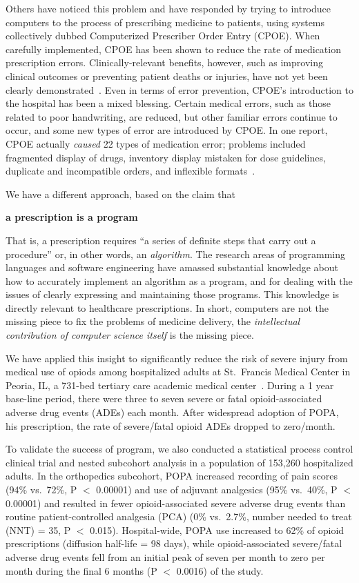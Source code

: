 \documentclass[11pt]{article}
\begin{document}
Others have noticed this problem and have responded by trying to
introduce computers to the process of prescribing medicine to
patients, using systems collectively dubbed Computerized Prescriber
Order Entry (CPOE).
%
When carefully implemented, CPOE has been shown to reduce the rate of
medication prescription errors.
%
Clinically-relevant benefits, however, such
as improving clinical outcomes or preventing patient deaths or
injuries, have not yet been clearly demonstrated~\citep{vanRosse2009}.
%
Even in terms of error prevention, CPOE's introduction to the hospital
has been a mixed blessing.
%
Certain medical errors, such as those related to poor handwriting, are
reduced, but other familiar errors continue to occur, and some new types
of error are introduced by CPOE.
%
In one report, CPOE actually \emph{caused} 22 types of medication
error; problems included fragmented display of drugs, inventory
display mistaken for dose guidelines, duplicate and incompatible
orders, and inflexible formats~\citep{Koppel2005}.

We have a different approach, based on the claim that
\begin{center}
\textbf{a prescription is a program}
\end{center}
That is, a prescription requires ``a series of definite steps that
carry out a procedure'' or, in other words, an \emph{algorithm}.
%
The research areas of programming languages and software engineering
have amassed substantial knowledge about how to accurately implement
an algorithm as a program, and for dealing with the issues of clearly
expressing and maintaining those programs.
%
This knowledge is directly
relevant to healthcare prescriptions.
%
In short, computers are not the missing piece to fix the problems of
medicine delivery, the \emph{intellectual contribution of computer
  science itself} is the missing piece.

We have applied this insight to significantly reduce the risk of severe
injury from medical use of opiods among hospitalized adults at
St.\ Francis Medical Center in Peoria, IL, a 731-bed tertiary care
academic medical center~\citep{Belknap2008}. During a 1 year base-line
period, there were three to seven severe or fatal opioid-associated
adverse drug events (ADEs) each month. After widespread adoption of
POPA, his prescription, the rate of severe/fatal opioid ADEs dropped
to zero/month. 

To validate the success of \poppl{} program, we also
conducted a statistical process control clinical trial and nested
subcohort analysis in a population of 153,260 hospitalized adults. In
the orthopedics subcohort, POPA increased recording of pain scores
(94\% vs.\ 72\%, P $<$ 0.00001) and use of adjuvant analgesics (95\%
vs.\ 40\%, P $<$ 0.00001) and resulted in fewer opioid-associated
severe adverse drug events than routine patient-controlled analgesia
(PCA) (0\% vs.\ 2.7\%, number needed to treat (NNT) = 35, P $<$
0.015). Hospital-wide, POPA use increased to 62\% of opioid
prescriptions (diffusion half-life = 98 days), while opioid-associated
severe/fatal adverse drug events fell from an initial peak of seven
per month to zero per month during the final 6 months (P $<$ 0.0016)
of the study.
\end{document}
